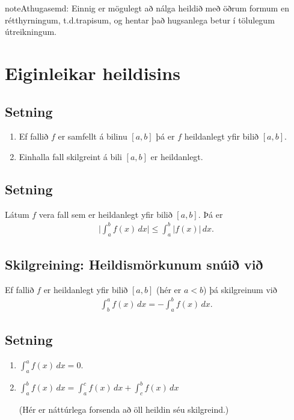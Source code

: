 \documentclass[b5paper,11pt,icelandic]{sphinxmanual}
\begin{document}
\begin{notice}{note}{Athugasemd:}
Einnig er mögulegt að nálga heildið með öðrum formum en rétthyrningum,
t.d.trapisum, og hentar það hugsanlega betur í
tölulegum útreikningum.
\end{notice}


\section{Eiginleikar heildisins}
\label{kafli06:eiginleikar-heildisins}

\subsection{Setning}
\label{kafli06:setning}\begin{enumerate}
\item {} 
Ef fallið \(f\) er samfellt á bilinu \([a, b]\) þá er
\(f\) heildanlegt yfir bilið \([a, b]\).

\item {} 
Einhalla fall skilgreint á bili \([a,b]\) er heildanlegt.

\end{enumerate}


\subsection{Setning}
\label{kafli06:id2}
Látum \(f\) vera fall sem er heildanlegt yfir bilið \([a, b]\).
Þá er
\begin{equation*}
\begin{split}\Big|\int_a^b f(x)\,dx\Big|\leq \int_a^b |f(x)|\,dx.\end{split}
\end{equation*}

\subsection{Skilgreining: Heildismörkunum snúið við}
\label{kafli06:skilgreining-heildismorkunum-snui-vi}
Ef fallið \(f\) er heildanlegt yfir bilið \([a,b]\) (hér er
\(a<b\)) þá skilgreinum við
\begin{equation*}
\begin{split}\int_b^a f(x)\,dx=-\int_a^b f(x)\,dx.\end{split}
\end{equation*}

\subsection{Setning}
\label{kafli06:id3}\begin{enumerate}
\item {} 
\(\int_a^a f(x)\,dx=0\).

\item {} 
\(\int_a^b f(x)\,dx=\int_a^c f(x)\,dx+\int_c^b f(x)\,dx\)

(Hér er náttúrlega forsenda að öll heildin séu skilgreind.)

\end{enumerate}
\end{document}
